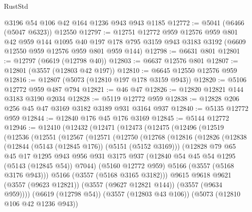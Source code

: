 \begin{lexlean}{RustStd}
\begin{coremodule}
    @3196
    @54
    @106
    @42
    @164
    @1236
    @943
    @943
    @1185
@12772 := @5041 (@6466 (@5047 @6323)) @12550
@12797 := @12751
    @12772
    @959
    @12576
    @959
    @801
    @42
    @959
    @144
    @1095
    @40
    @197
    @178
    @795
    @3159
    @943
    @3183
    @3192
    (@6609 @12550 @959 @12576 @959 @801 @959 @144)
@12798 := @6631 @801
@12801 := @12797 (@6619 (@12798 @40))
@12803 := @6637 @12576 @801
@12807 := @12801 (@3557 (@12803 @42 @197))
@12810 := @6645 @12550 @12576 @959
@12816 := @12807 (@5073 (@12810 @197 @178 @3159 @943))
@12820 := @5106 @12772 @959 @487 @794
@12821 := @46 @47
@12826 := @12820 @12821 @144 @3183 @3190 @2034
@12828 := @5119 @12772 @959
@12838 := @12828 @206 @256 @45 @47 @3169 @3182 @3189 @931 @3164 @937
@12840 := @5135 @12772 @959
@12844 := @12840 @176 @45 @176 @3169
@12845 := @5144 @12772
@12946 := @12410
    (@12432
      (@12471
        (@12473
          (@12475
            (@12496
              (@12519
                (@12536
                  (@12551
                    (@12567
                      (@12571
                        (@12750
                          (@12768
                            (@12816
                              (@12826
                                (@12838
                                  (@12844 (@5143 (@12845 @176)) (@5151 (@5152 @3169)))
                                  (@12828
                                    @79
                                    @65
                                    @45
                                    @17
                                    @1295
                                    @943
                                    @956
                                    @931
                                    @3175
                                    @937
                                    (@12840 @54 @45 @54 @1295 (@5143 (@12845 @54)) @7044)
                                    (@5160 @12772 @959)
                                    @5166
                                    (@3557 (@5168 @3176 @943)))
                                  @5166
                                  (@3557 (@5168 @3165 @3182)))
                                @9615
                                @9618
                                @9621
                                (@3557 (@9623 @12821))
                                (@3557 (@9627 @12821 @144))
                                (@3557 (@9634 @959))))
                            (@6619 (@12798 @54))
                            (@3557 (@12803 @43 @106))
                            (@5073 (@12810 @106 @42 @1236 @943))

\end{coremodule}
\end{lexlean}
